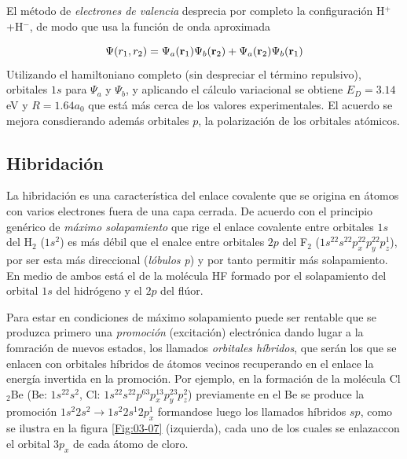 El método de \textit{electrones de valencia} desprecia por completo la configuración  H$^+$+H$^-$, de modo que usa la función de onda aproximada

\begin{equation}
    \Psi (r_1,r_2) =  \Psi_a (\mathbf{r}_1) \Psi_b (\mathbf{r}_2) + \Psi_a (\mathbf{r}_2) \Psi_b (\mathbf{r}_1)
\end{equation}
Utilizando el hamiltoniano completo (sin despreciar el término repulsivo), orbitales $1s$ para $\Psi_a$ y $\Psi_b$, y aplicando el cálculo variacional se obtiene $E_D = 3.14$ eV y $R=1.64a_0$ que está más cerca de los valores experimentales. El acuerdo se mejora consdierando además orbitales $p$, la polarización de los orbitales atómicos.

\subsection{Hibridación}

La hibridación es una característica del enlace covalente que se origina en átomos con varios electrones fuera de una capa cerrada. De acuerdo con el principio genérico de \textit{máximo solapamiento} que rige el enlace covalente entre orbitales $1s$ del H$_2$ ($1s^2$) es más débil que el enalce entre orbitales $2p$ del F$_2$ ($1s^22s^22p_x^22p_y^22p_z^1$), por ser esta más direccional (\textit{lóbulos p}) y por tanto permitir más solapamiento. En medio de ambos está el de la molécula HF formado por el solapamiento del orbital $1s$ del hidrógeno y el $2p$ del flúor.

Para estar en condiciones de máximo solapamiento puede ser rentable que se produzca primero una \textit{promoción} (excitación) electrónica dando lugar a la fomración de nuevos estados, los llamados \textit{orbitales híbridos}, que serán los que se enlacen con orbitales híbridos de átomos vecinos recuperando en el enlace la energía invertida en la promoción. Por ejemplo, en la formación de la molécula Cl$_2$Be (Be: $1s^22s^2$, Cl: $1s^22s^22p^63p_x^13p_y^23p_z^2$) previamente en el Be se produce la promoción $1s^2 2s^2 \rightarrow 1s^2 2s^1 2p_x^1$ formandose luego los llamados híbridos $sp$, como se ilustra en la figura \ref{Fig:03-07} (izquierda), cada uno de los cuales se enlazaccon el orbital $3p_x$ de cada átomo de cloro.

